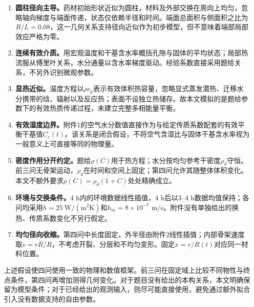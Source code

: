 \begin{enumerate}[label=\textbf{假设\arabic*：},leftmargin=4.7em]
\item \textbf{圆柱径向主导。}药材初始形状近似为圆柱，材料及外部交换在周向上均匀，忽略轴向梯度与端面传递，状态仅依赖半径和时间。端面总面积与侧面积之比为$R/L=0.08$，这一几何关系支持径向近似作为初步模型，但不意味着端部局部效应严格为零。
\item \textbf{连续有效介质。}用宏观温度和干基含水率概括孔隙与固体的平均状态；局部热流服从傅里叶关系，水分通量以含水率梯度驱动。经验系数直接采用题给关系，不另外识别微观参数。
\item \textbf{显热近似。}温度方程以$\rho c_p$表示有效体积热容量，忽略显式蒸发潜热、迁移水分携带的焓、辐射以及反应热；表面不设独立热储存。故本文模拟的是题给参数下的有效热质传递过程，未建立完整多相能量平衡。
\item \textbf{有效湿度边界。}附件1的空气水分数值直接作为与给定传质系数配套的有效平衡干基值$C_e(t)$。该关系是闭合假设，不将空气含湿比与固体干基含水率视为一般意义上可直接等同的物理量。
\item \textbf{密度作用分开约定。}题给$\rho(C)$用于热方程；水分按均匀参考干密度$\rho_d$守恒。前三问无骨架运动，$\rho_d$在时间和空间上固定；第四问允许其随整体体积变化。本文不额外要求$\rho(C)=\rho_d(1+C)$处处精确成立。
\item \textbf{环境与交换条件。}4 h内的环境数据线性插值，4 h后以3--4 h数据均值保持；各问均采用$h=25\ \mathrm{W/(m^2K)}$和$h_m=8\times10^{-7}$ m/s。附件没有单独给出的换热、传质系数变化不另行假定。
\item \textbf{均匀径向收缩。}第四问中长度固定，外半径由附件2线性插值；内部骨架速度取$v=r\dot R/R$，不考虑开裂、分层和不均匀变形。固定$x=r/R(t)$对应同一材料位置。
\end{enumerate}

上述假设使四问使用一致的物理和数值框架。前三问在固定域上比较不同物性与终点条件，第四问再增加测得几何变化。对于题目没有给出的本构关系，本文明确保留为模型条件；对于已经给出的观测输入，则尽可能直接使用，避免通过额外拟合引入没有数据支持的自由参数。


\nextpage
